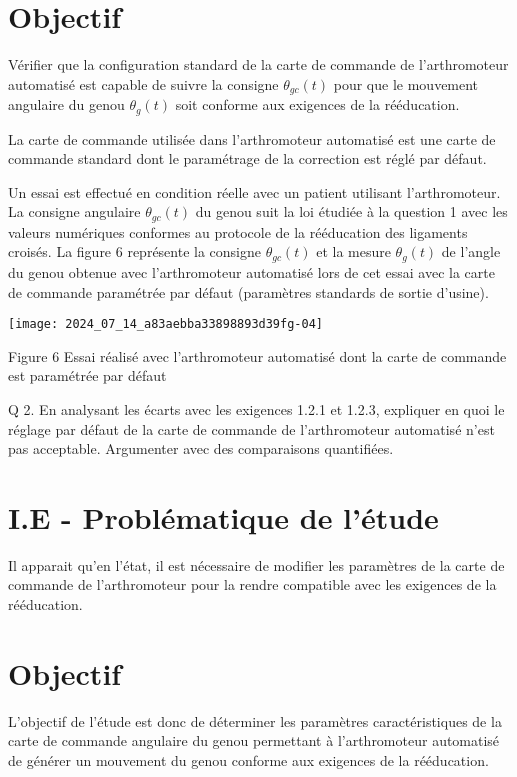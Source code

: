 \section*{Objectif}
Vérifier que la configuration standard de la carte de commande de l'arthromoteur automatisé est capable de suivre la consigne $\theta_{g c}(t)$ pour que le mouvement angulaire du genou $\theta_{g}(t)$ soit conforme aux exigences de la rééducation.

La carte de commande utilisée dans l'arthromoteur automatisé est une carte de commande standard dont le paramétrage de la correction est réglé par défaut.

Un essai est effectué en condition réelle avec un patient utilisant l'arthromoteur. La consigne angulaire $\theta_{g c}(t)$ du genou suit la loi étudiée à la question 1 avec les valeurs numériques conformes au protocole de la rééducation des ligaments croisés. La figure 6 représente la consigne $\theta_{g c}(t)$ et la mesure $\theta_{g}(t)$ de l'angle du genou obtenue avec l'arthromoteur automatisé lors de cet essai avec la carte de commande paramétrée par défaut (paramètres standards de sortie d'usine).

\begin{center}
\texttt{[image: 2024\_07\_14\_a83aebba33898893d39fg-04]}
\end{center}

Figure 6 Essai réalisé avec l'arthromoteur automatisé dont la carte de commande est paramétrée par défaut

Q 2. En analysant les écarts avec les exigences 1.2.1 et 1.2.3, expliquer en quoi le réglage par défaut de la carte de commande de l'arthromoteur automatisé n'est pas acceptable. Argumenter avec des comparaisons quantifiées.

\section*{I.E - Problématique de l'étude}
Il apparait qu'en l'état, il est nécessaire de modifier les paramètres de la carte de commande de l'arthromoteur pour la rendre compatible avec les exigences de la rééducation.

\section*{Objectif}
L'objectif de l'étude est donc de déterminer les paramètres caractéristiques de la carte de commande angulaire du genou permettant à l'arthromoteur automatisé de générer un mouvement du genou conforme aux exigences de la rééducation.

